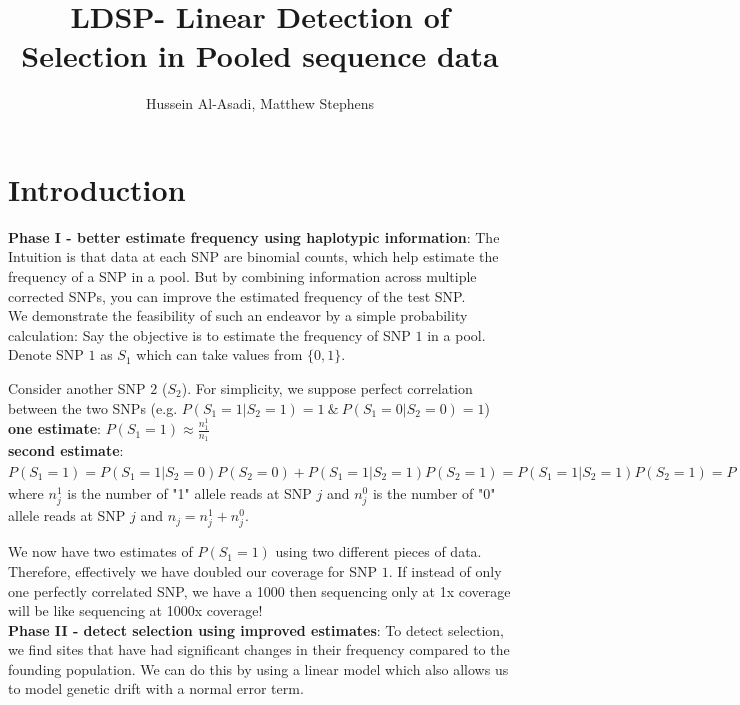 \documentclass[10pt,a4paper,draft]{article}
\title{LDSP- Linear Detection of Selection in Pooled sequence data}
\date{}
\author{Hussein Al-Asadi, Matthew Stephens}
\begin{document}
\maketitle
\section{Introduction}
\textbf{Phase I - better estimate frequency using haplotypic information}:
The Intuition is that data at each SNP are binomial counts, which help estimate the frequency of a SNP in a pool. But by combining information across multiple corrected SNPs, you can improve the estimated frequency of the test SNP. \\

We demonstrate the feasibility of such an endeavor by a simple probability calculation: Say the objective is to estimate the frequency of SNP $1$ in a  pool. Denote SNP $1$ as $S_1$ which can take values from $\{0,1\}$.

Consider another SNP $2$ ($S_2$). For simplicity, we suppose perfect correlation between the two SNPs (e.g. $P(S_1 = 1 | S_2 = 1) = 1 \ \& \ P(S_1 = 0 | S_2 = 0) = 1$) \\

\textbf{one estimate}: $P(S_1 = 1) \approx \frac{n_1^1}{n_1}$ \\
\textbf{second estimate}:  $P(S_1 = 1) = P(S_1 = 1 | S_2 = 0)P(S_2=0) + P(S_1 = 1 | S_2 = 1)P(S_2=1) = P(S_1 = 1 | S_2 = 1)P(S_2 = 1) = P(S_2 = 1) \approx \frac{n_2^1}{n_2}$ \\

where $n_j^1$ is the number of "1" allele reads at SNP $j$ and $n_j^0$ is the number of "0" allele reads at SNP $j$ and $n_j = n_j^1 + n_j^0$. 

We now have two estimates of $P(S_1=1)$ using two different pieces of data. Therefore, effectively we have doubled our coverage for SNP $1$. If instead of only one perfectly correlated SNP, we have a 1000 then sequencing only at 1x coverage will be like sequencing at 1000x coverage! \\


\textbf{Phase II - detect selection using improved estimates}:
To detect selection, we find sites that have had significant changes in their frequency compared to the founding population. We can do this by using a linear model which also allows us to model genetic drift with a normal error term.
\end{document}
